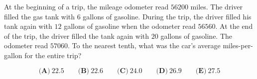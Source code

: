

At the beginning of a trip, the mileage odometer read $ 56200$ miles. The driver filled the gas tank with  $ 6$ gallons of gasoline. During the trip, the driver filled his tank again with $ 12$ gallons of gasoline when the odometer read $ 56560$. At the end of the trip, the driver filled the tank again with $ 20$ gallons of gasoline. The odometer read $ 57060$. To the nearest tenth, what was the car's average miles-per-gallon for the entire trip?

\[ \textbf{(A)}\ 22.5 \qquad
\textbf{(B)}\ 22.6 \qquad
\textbf{(C)}\ 24.0 \qquad
\textbf{(D)}\ 26.9 \qquad
\textbf{(E)}\ 27.5
\]